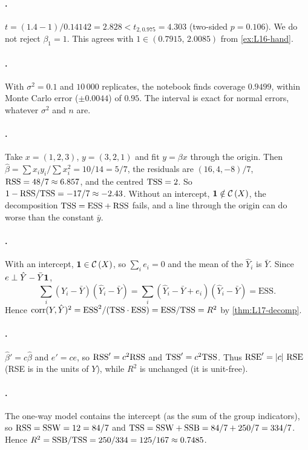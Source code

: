 \paragraph{.}
$t=(1.4-1)/0.14142=2.828<t_{2,0.975}=4.303$ (two-sided $p=0.106$). We do not reject $\beta_1=1$. This agrees with
$1\in(0.7915,\,2.0085)$ from \cref{ex:L16-hand}.

\paragraph{.}
With $\sigma^2=0.1$ and $10\,000$ replicates, the notebook finds coverage $0.9499$, within Monte Carlo error
($\pm0.0044$) of $0.95$. The interval is exact for normal errors, whatever $\sigma^2$ and $n$ are.

\paragraph{.}
Take $x=(1,2,3)$, $y=(3,2,1)$ and fit $y=\beta x$ through the origin. Then $\hat\beta=\sum x_iy_i/\sum x_i^2=10/14=5/7$, the
residuals are $(16,4,-8)/7$, $\mathrm{RSS}=48/7\approx6.857$, and the centred $\mathrm{TSS}=2$. So $1-\mathrm{RSS}/\mathrm{TSS}=-17/7\approx-2.43$.
Without an intercept, $\mathbf 1\notin\mathcal{C}\left(X\right)$, the decomposition $\mathrm{TSS}=\mathrm{ESS}+\mathrm{RSS}$ fails, and a line through the
origin can do worse than the constant $\bar y$.

\paragraph{.}
With an intercept, $\mathbf 1\in\mathcal{C}\left(X\right)$, so $\sum_ie_i=0$ and the mean of the $\hat Y_i$ is $\bar Y$. Since $e\perp\hat Y-\bar Y\mathbf 1$,
\[
\sum_i(Y_i-\bar Y)(\hat Y_i-\bar Y)=\sum_i(\hat Y_i-\bar Y+e_i)(\hat Y_i-\bar Y)=\mathrm{ESS}.
\]
Hence $\operatorname{corr}(Y,\hat Y)^2=\mathrm{ESS}^2/(\mathrm{TSS}\cdot\mathrm{ESS})=\mathrm{ESS}/\mathrm{TSS}=R^2$ by \cref{thm:L17-decomp}.

\paragraph{.}
$\hat\beta'=c\hat\beta$ and $e'=ce$, so $\mathrm{RSS}'=c^2\mathrm{RSS}$ and $\mathrm{TSS}'=c^2\mathrm{TSS}$. Thus $\mathrm{RSE}'=\left|c\right|\,\mathrm{RSE}$ (RSE is in the units of $Y$),
while $R^2$ is unchanged (it is unit-free).

\paragraph{.}
The one-way model contains the intercept (as the sum of the group indicators), so $\mathrm{RSS}=\mathrm{SSW}=12=84/7$ and
$\mathrm{TSS}=\mathrm{SSW}+\mathrm{SSB}=84/7+250/7=334/7$. Hence $R^2=\mathrm{SSB}/\mathrm{TSS}=250/334=125/167\approx0.7485$.

